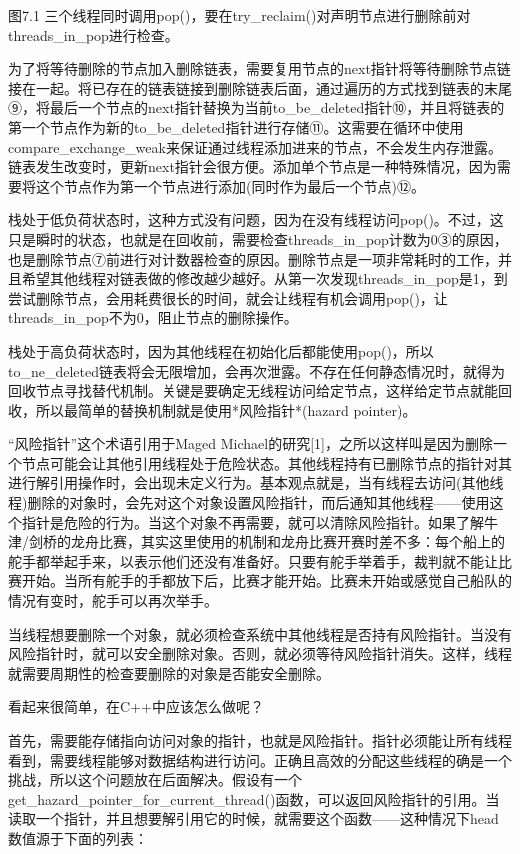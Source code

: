 图7.1 三个线程同时调用pop()，要在try\_reclaim()对声明节点进行删除前对threads\_in\_pop进行检查。

为了将等待删除的节点加入删除链表，需要复用节点的next指针将等待删除节点链接在一起。将已存在的链表链接到删除链表后面，通过遍历的方式找到链表的末尾⑨，将最后一个节点的next指针替换为当前to\_be\_deleted指针⑩，并且将链表的第一个节点作为新的to\_be\_deleted指针进行存储⑪。这需要在循环中使用compare\_exchange\_weak来保证通过线程添加进来的节点，不会发生内存泄露。链表发生改变时，更新next指针会很方便。添加单个节点是一种特殊情况，因为需要将这个节点作为第一个节点进行添加(同时作为最后一个节点)⑫。

栈处于低负荷状态时，这种方式没有问题，因为在没有线程访问pop()。不过，这只是瞬时的状态，也就是在回收前，需要检查threads\_in\_pop计数为0③的原因，也是删除节点⑦前进行对计数器检查的原因。删除节点是一项非常耗时的工作，并且希望其他线程对链表做的修改越少越好。从第一次发现threads\_in\_pop是1，到尝试删除节点，会用耗费很长的时间，就会让线程有机会调用pop()，让threads\_in\_pop不为0，阻止节点的删除操作。

栈处于高负荷状态时，因为其他线程在初始化后都能使用pop()，所以to\_ne\_deleted链表将会无限增加，会再次泄露。不存在任何静态情况时，就得为回收节点寻找替代机制。关键是要确定无线程访问给定节点，这样给定节点就能回收，所以最简单的替换机制就是使用*风险指针*(hazard pointer)。


“风险指针”这个术语引用于Maged Michael的研究[1]，之所以这样叫是因为删除一个节点可能会让其他引用线程处于危险状态。其他线程持有已删除节点的指针对其进行解引用操作时，会出现未定义行为。基本观点就是，当有线程去访问(其他线程)删除的对象时，会先对这个对象设置风险指针，而后通知其他线程——使用这个指针是危险的行为。当这个对象不再需要，就可以清除风险指针。如果了解牛津/剑桥的龙舟比赛，其实这里使用的机制和龙舟比赛开赛时差不多：每个船上的舵手都举起手来，以表示他们还没有准备好。只要有舵手举着手，裁判就不能让比赛开始。当所有舵手的手都放下后，比赛才能开始。比赛未开始或感觉自己船队的情况有变时，舵手可以再次举手。

当线程想要删除一个对象，就必须检查系统中其他线程是否持有风险指针。当没有风险指针时，就可以安全删除对象。否则，就必须等待风险指针消失。这样，线程就需要周期性的检查要删除的对象是否能安全删除。

看起来很简单，在C++中应该怎么做呢？

首先，需要能存储指向访问对象的指针，也就是风险指针。指针必须能让所有线程看到，需要线程能够对数据结构进行访问。正确且高效的分配这些线程的确是一个挑战，所以这个问题放在后面解决。假设有一个get\_hazard\_pointer\_for\_current\_thread()函数，可以返回风险指针的引用。当读取一个指针，并且想要解引用它的时候，就需要这个函数——这种情况下head数值源于下面的列表：

